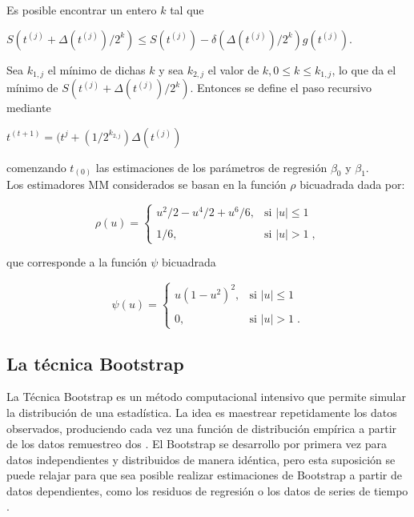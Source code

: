Es posible encontrar un entero $k$ \parencite{yohai-1987} tal que\\

\begin{center}
{\large	$ S(t^{(j)} + \Delta(t^{(j)} )/2^{k}) \leq S(t^{(j)}) - \delta( \Delta(t^{(j)} )/2^{k} ) g(t^{(j)})$}. \\
\end{center}


Sea $k_{1,j}$ el mínimo de dichas $k$ y sea $k_{2,j}$ el valor de $k, 0 \leq k  \leq k_{1,j}$, lo que da el mínimo de $S(t^{(j)} + \Delta(t^{(j)} )/2^{k})$. Entonces se define el paso recursivo mediante\\

\begin{center}
{\large	$ t^{(t+1)} = (t^{j} + (1/2^{k_{2,j}}) \Delta(t^{(j)} )$} \\
\end{center}

comenzando $t_{(0)} $ las estimaciones de los parámetros de regresión $\beta_{0}$ y $\beta_{1}$.\\

Los estimadores MM considerados se basan en la función $\rho$ bicuadrada dada por:


\[
\rho(u) =
\begin{cases}
	u^{2}/2 - u^{4}/2 + u^{6}/6, & \text{si } |u| \leq 1 \\ \\
	1/6, & \text{si } |u| > 1 \; ,
\end{cases}
\]


que corresponde a la función $\psi$ bicuadrada

\[
\psi(u) =
\begin{cases}
	u(1- u^{2})^{2}	, & \text{si } |u| \leq 1 \\ \\
	0,     & \text{si } | u | > 1 \; .
\end{cases}
\]



\subsection{La técnica Bootstrap}

La Técnica Bootstrap es un método computacional intensivo que permite simular la distribución de una estadística. La idea es maestrear repetidamente los datos observados, produciendo cada vez una función de distribución empírica a partir de los datos remuestreo dos \parencite{zacarias-2023}. El Bootstrap se desarrollo por primera vez para datos independientes y distribuidos de manera idéntica, pero esta suposición se puede relajar para que sea posible realizar estimaciones de Bootstrap a partir de datos dependientes, como los residuos de regresión o los datos de series de tiempo \parencite{givens-2013}.\\


